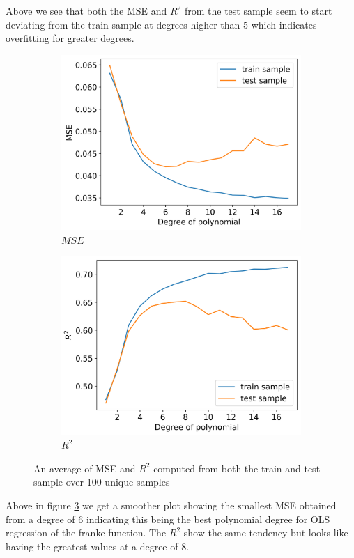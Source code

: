 \documentclass[12pt]{article}
\begin{document}
Above we see that both the MSE and $R^2$ from the test sample seem to start deviating from the train sample at degrees higher than 5 which indicates overfitting for greater degrees.
\begin{figure}[H]
  \begin{subfigure}{.5\textwidth}
    \centering
    \includegraphics[width=\textwidth]{../figures/MSE_train_test_resample.png}
    \caption{$MSE$}
    \label{fig:train_test_resample_mse}
  \end{subfigure}
  \begin{subfigure}{.5\textwidth}
    \centering
    \includegraphics[width=\textwidth]{../figures/R2_train_test_resample.png}
    \caption{$R^2$}
    \label{fig:}
  \end{subfigure}
  \caption{An average of MSE and $R^2$ computed from both the train and test sample over 100 unique samples}
  \label{fig:train_test_resample}
\end{figure}
Above in figure \ref{fig:train_test_resample} we get a smoother plot showing the smallest MSE obtained from a degree of 6 indicating this being the best polynomial degree for OLS regression of the franke function. The $R^2$ show the same tendency but looks like having the greatest values at a degree of 8.
\end{document}
